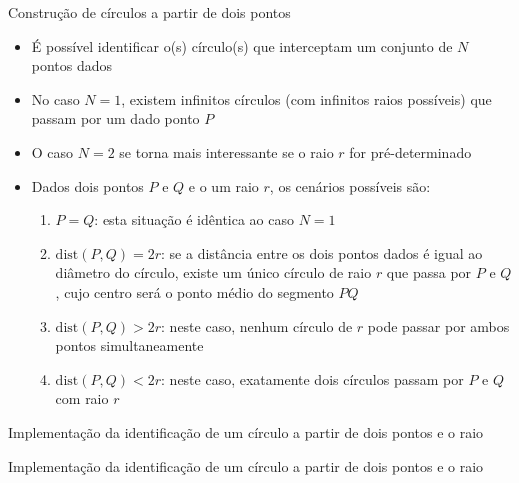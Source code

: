 \begin{frame}[fragile]{Construção de círculos a partir de dois pontos}

    \begin{itemize}
        \item É possível identificar o(s) círculo(s) que interceptam um conjunto de $N$ pontos dados
    
        \item No caso $N = 1$, existem infinitos círculos (com infinitos raios possíveis) que 
            passam por um dado ponto $P$

        \item O caso $N = 2$ se torna mais interessante se o raio $r$ for pré-determinado

        \item Dados dois pontos $P$ e $Q$ e o um raio $r$, os cenários possíveis são:

        \begin{enumerate}
            \item $P = Q$: esta situação é idêntica ao caso $N = 1$
            \item $\mathrm{dist}(P, Q) = 2r$: se a distância entre os dois pontos dados é igual ao 
                diâmetro do círculo, existe um único círculo de raio $r$ que passa por $P$ e $Q$, 
                    cujo centro será o ponto médio do segmento $PQ$
            \item $\mathrm{dist}(P, Q) > 2r$: neste caso, nenhum círculo de $r$ pode passar por 
                ambos pontos simultaneamente
            \item $\mathrm{dist}(P, Q) < 2r$: neste caso, exatamente dois círculos passam por $P$ e $Q$ com raio $r$
        \end{enumerate}
    \end{itemize}

\end{frame}

\begin{frame}[fragile]{Implementação da identificação de um círculo a partir de dois pontos e o raio}
\end{frame}

\begin{frame}[fragile]{Implementação da identificação de um círculo a partir de dois pontos e o raio}
\end{frame}

